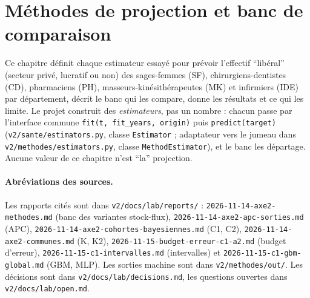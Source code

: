 \begingroup\sloppy %
\section{Méthodes de projection et banc de comparaison}\label{sec:methodes-ref}
\label{met:sec}

Ce chapitre définit chaque estimateur essayé pour prévoir l'effectif \enquote{libéral} (secteur privé,
lucratif ou non) des sages-femmes (SF), chirurgiens-dentistes (CD), pharmaciens (PH),
masseurs-kinésithérapeutes (MK) et infirmiers (IDE) par département, décrit le banc qui les compare, donne
les résultats et ce qui les limite. Le projet construit des \emph{estimateurs}, pas un nombre : chacun
passe par l'interface commune \texttt{fit(t, fit\_years, origin)} puis \texttt{predict(target)}
(\texttt{v2/sante/estimators.py}, classe \texttt{Estimator} ; adaptateur vers le jumeau dans
\texttt{v2/methodes/estimators.py}, classe \texttt{MethodEstimator}), et le banc les départage. Aucune
valeur de ce chapitre n'est \enquote{la} projection.

\paragraph{Abréviations des sources.} Les rapports cités sont dans \texttt{v2/docs/lab/reports/} :
\texttt{2026-11-14-axe2-methodes.md} (banc des variantes stock-flux), \texttt{2026-11-14-axe2-apc-sorties.md}
(APC), \texttt{2026-11-14-axe2-cohortes-bayesiennes.md} (C1, C2), \texttt{2026-11-14-axe2-communes.md}
(K, K2), \texttt{2026-11-15-budget-erreur-c1-a2.md} (budget d'erreur), \texttt{2026-11-15-c1-intervalles.md}
(intervalles) et \texttt{2026-11-15-c1-gbm-global.md} (GBM, MLP). Les sorties machine sont dans
\texttt{v2/methodes/out/}. Les décisions sont dans \texttt{v2/docs/lab/decisions.md}, les questions
ouvertes dans \texttt{v2/docs/lab/open.md}.

